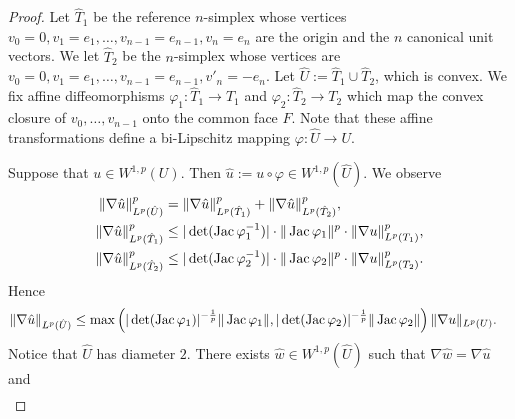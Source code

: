 \documentclass[10pt,letterpaper]{article}
\begin{document}
\begin{proof}
    Let $\hat T_1$ be the reference $n$-simplex whose vertices $v_0=0, v_1=e_1, \dots, v_{n-1} = e_{n-1}, v_n = e_n$ are the origin and the $n$ canonical unit vectors. 
    We let $\hat T_2$ be the $n$-simplex whose vertices are $v_0=0, v_1=e_1, \dots, v_{n-1} = e_{n-1}, v'_n = -e_n$. 
    Let $\hat U := \hat T_1 \cup \hat T_2$, which is convex. 
    We fix affine diffeomorphisms $\varphi_1 : \hat T_1 \rightarrow T_1$ and $\varphi_2 : \hat T_2 \rightarrow T_2$
    which map the convex closure of $v_0, \dots, v_{n-1}$ onto the common face $F$.
    Note that these affine transformations define a bi-Lipschitz mapping $\varphi : \hat U \rightarrow U$. 
    
    Suppose that $u \in W^{1,p}(U)$. Then $\hat u := u \circ \varphi \in W^{1,p}(\hat U)$. 
    We observe 
    \begin{align*}
        \| \nabla \hat u \|_{L^{p}(\hat U)}^{p}
        &=
        \| \nabla \hat u \|_{L^{p}(\hat T_1)}^{p}
        +
        \| \nabla \hat u \|_{L^{p}(\hat T_2)}^{p}
        ,
        \\
        \| \nabla \hat u \|_{L^{p}(\hat T_1)}^{p}
        &\leq 
        |\det(\operatorname{{\rm Jac}} \varphi_1^{-1})|
        \cdot \| \operatorname{{\rm Jac}} \varphi_1 \|^{p}
        \cdot 
        \| \nabla u \|_{L^{p}(T_1)}^{p}
        ,
        \\
        \| \nabla \hat u \|_{L^{p}(\hat T_2)}^{p}
        &\leq 
        |\det(\operatorname{{\rm Jac}} \varphi_2^{-1})|
        \cdot \| \operatorname{{\rm Jac}} \varphi_2 \|^{p}
        \cdot 
        \| \nabla u \|_{L^{p}(T_2)}^{p}
        .
    \end{align*}
    Hence 
    \begin{align*}
        \| \nabla \hat u \|_{L^{p}(\hat U)}
        &\leq 
        \max\left( 
            |\det(\operatorname{{\rm Jac}} \varphi_1)|^{-\frac 1 p} \| \operatorname{{\rm Jac}} \varphi_1 \|
            ,
            |\det(\operatorname{{\rm Jac}} \varphi_2)|^{-\frac 1 p} \| \operatorname{{\rm Jac}} \varphi_2 \|
        \right)
        \| \nabla u \|_{L^{p}(U)}
        .
    \end{align*}
    Notice that $\hat U$ has diameter $2$. 
    There exists $\hat w \in W^{1,p}(\hat U)$ such that $\nabla \hat w = \nabla \hat u$ and 
    \begin{align*}

\end{align*}
\end{proof}
\end{document}
